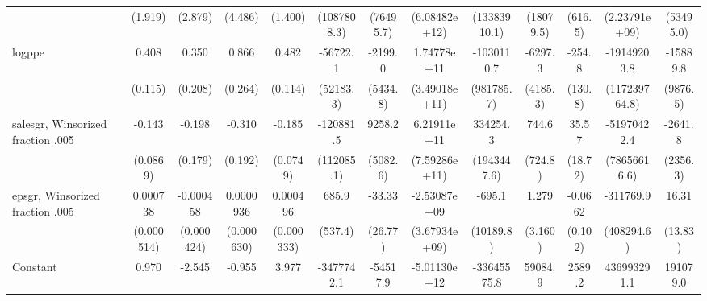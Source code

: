 \begin{table}[htbp]
\begin{tabular}{l*{12}{c}}
                    &     (1.919)         &     (2.879)         &     (4.486)         &     (1.400)         & (1087808.3)         &   (76495.7)         &(6.08482e+12)         &(13383910.1)         &   (18079.5)         &     (616.5)         &(2.23791e+09)         &   (53495.0)         \\
[1em]
logppe              &       0.408\sym{***}&       0.350         &       0.866\sym{***}&       0.482\sym{***}&    -56722.1         &     -2199.0         & 1.74778e+11         &  -1030110.7         &     -6297.3         &      -254.8\sym{*}  & -19149203.8         &    -15889.8         \\
                    &     (0.115)         &     (0.208)         &     (0.264)         &     (0.114)         &   (52183.3)         &    (5434.8)         &(3.49018e+11)         &  (981785.7)         &    (4185.3)         &     (130.8)         &(117239764.8)         &    (9876.5)         \\
[1em]
salesgr, Winsorized fraction .005&      -0.143         &      -0.198         &      -0.310         &      -0.185\sym{**} &   -120881.5         &      9258.2\sym{*}  & 6.21911e+11         &    334254.3         &       744.6         &       35.57\sym{*}  & -51970422.4         &     -2641.8         \\
                    &    (0.0869)         &     (0.179)         &     (0.192)         &    (0.0749)         &  (112085.1)         &    (5082.6)         &(7.59286e+11)         & (1943447.6)         &     (724.8)         &     (18.72)         &(78656616.6)         &    (2356.3)         \\
[1em]
epsgr, Winsorized fraction .005&    0.000738         &   -0.000458         &   0.0000936         &    0.000496         &       685.9         &      -33.33         &-2.53087e+09         &      -695.1         &       1.279         &     -0.0662         &   -311769.9         &       16.31         \\
                    &  (0.000514)         &  (0.000424)         &  (0.000630)         &  (0.000333)         &     (537.4)         &     (26.77)         &(3.67934e+09)         &   (10189.8)         &     (3.160)         &     (0.102)         &  (408294.6)         &     (13.83)         \\
[1em]
Constant            &       0.970         &      -2.545         &      -0.955         &       3.977\sym{*}  &  -3477742.1         &    -54517.9         &-5.01130e+12\sym{***}& -33645575.8\sym{*}  &     59084.9\sym{*}  &      2589.2\sym{**} & 436993291.1         &    191079.0\sym{*}  \\

\end{tabular}
\end{table}
